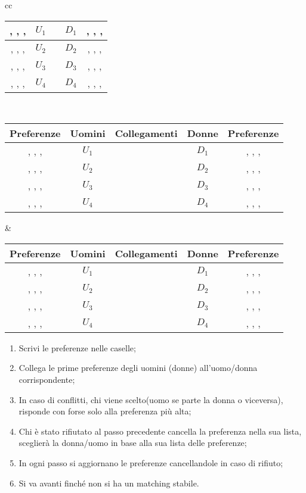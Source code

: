 \documentclass{article}
\theoremstyle{definition}
\theoremstyle{remark}
\begin{document}
\begin{center}
\begin{tabular}{cc}
\begin{tabular}{|c|c|p{2cm}|c|c|}
            \hline
            {  ,  ,  ,}&\(U_1\) &&\(D_1\) & {  ,  ,  ,}\\
            \hline
            {  ,  ,  ,}&\(U_2\) &&\(D_2\) & {  ,  ,  ,}\\
            \hline
            {  ,  ,  ,}&\(U_3\) &&\(D_3\) & {  ,  ,  ,}\\
            \hline
            {  ,  ,  ,}&\(U_4\) &&\(D_4\) & {  ,  ,  ,}\\
            \hline
          \end{tabular}\\
          \begin{tabular}{|c|c|p{2cm}|c|c|}
            \hline
            Preferenze & Uomini&Collegamenti &Donne & Preferenze\\
            \hline
            {  ,  ,  ,}&\(U_1\) &&\(D_1\) & {  ,  ,  ,}\\
            \hline
            {  ,  ,  ,}&\(U_2\) &&\(D_2\) & {  ,  ,  ,}\\
            \hline
            {  ,  ,  ,}&\(U_3\) &&\(D_3\) & {  ,  ,  ,}\\
            \hline
            {  ,  ,  ,}&\(U_4\) &&\(D_4\) & {  ,  ,  ,}\\
            \hline
          \end{tabular} &
          \begin{tabular}{|c|c|p{2cm}|c|c|}
            \hline
            Preferenze & Uomini&Collegamenti &Donne & Preferenze\\
            \hline
            {  ,  ,  ,}&\(U_1\) &&\(D_1\) & {  ,  ,  ,}\\
            \hline
            {  ,  ,  ,}&\(U_2\) &&\(D_2\) & {  ,  ,  ,}\\
            \hline
            {  ,  ,  ,}&\(U_3\) &&\(D_3\) & {  ,  ,  ,}\\
            \hline
            {  ,  ,  ,}&\(U_4\) &&\(D_4\) & {  ,  ,  ,}\\
            \hline
          \end{tabular}
    \end{tabular}
\end{center}
\begin{enumerate}
    \item Scrivi le preferenze nelle caselle;
    \item Collega le prime preferenze degli uomini (donne) all'uomo/donna corrispondente;
    \item In caso di conflitti, chi viene scelto(uomo se parte la donna o viceversa), risponde con forse solo alla preferenza più alta;
    \item Chi è stato rifiutato al passo precedente cancella la preferenza nella sua lista, sceglierà la donna/uomo in base alla sua lista delle preferenze;
    \item In ogni passo si aggiornano le preferenze cancellandole in caso di rifiuto;
    \item Si va avanti finché non si ha un matching stabile.
\end{enumerate}
\end{document}
